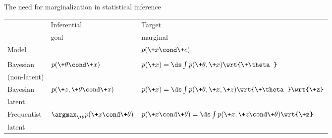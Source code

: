 \documentclass[10pt]{beamer}
\begin{document}
\begin{frame}{The need for marginalization in statistical inference}


\begin{table}[ht]
\centering %
\begin{tabular}{l | l l} %
 & Inferential & Target \\
& goal & marginal   \\   [.8ex]
Model &  & $p(\+x \cond \+c)$ \\ [.8ex]
\hline \\ [.8ex] %
Bayesian  & $p(\+\theta \cond \+x)$ & $p(\+x) = \ds\int p(\+\theta,\+x) \wrt{\+\theta}$  \\ 
(non-latent) & & \\  [.8ex]
Bayesian  & $p(\+z, \+\theta \cond \+x)$ &  $p(\+x) = \ds\int p(\+\theta,\+x, \+z) \wrt{\+\theta} \wrt{\+z}$  \\
latent & & \\  [.8ex]
Frequentist  & $\argmax_{\+\theta} p(\+x \cond \+\theta)$  & $p(\+x \cond \+\theta) = \ds\int p(\+x, \+z \cond \+\theta) \wrt{\+z}$   \\
latent & &  \\ [.8ex]
\end{tabular}
\label{vi_table} %
\end{table}

\end{frame}
\end{document}
